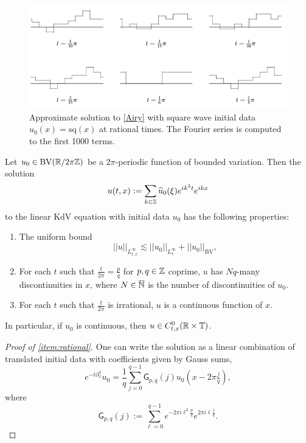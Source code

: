 \begin{figure}[h]
	\begin{center}
		\includegraphics{graphics/olver2}
	\end{center}
	\caption{Approximate solution to \eqref{Airy} with square wave initial data $u_0 (x) = \mathrm{sq}(x)$ at rational times. The Fourier series is computed to the first 1000 terms.}\label{fig:olver2}
\end{figure}

\begin{theorem}\label{thm:talbot}
	Let $u_0 \in \mathrm{BV} (\mathbb R/2\pi \mathbb Z)$ be a $2\pi$-periodic function of bounded variation. Then the solution 
		\[
			u(t, x) 
				:= \sum_{k \in \mathbb Z} \widehat u_0 (\xi) e^{i k^3 t} e^{i k x}
		\]
	to the linear KdV equation with initial data $u_0$ has the following properties: 
	\begin{enumerate}
		\item The uniform bound
			\[
				||u||_{L^{\infty}_{t, x}} 
					\lesssim ||u_0||_{L^\infty_x} + ||u_0||_{\mathrm{BV}}, 
			\]
		
			\item For each $t$ such that $\tfrac{t}{2\pi} = \tfrac{p}{q}$ for $p, q \in \mathbb Z$ coprime, $u$ has $Nq$-many discontinuities in $x$, where $N \in \overline {\mathbb N}$ is the number of discontinuities of $u_0$. \label{item:rational}
        
			\item For each $t$ such that $\tfrac{t}{2\pi}$ is irrational, $u$ is a continuous function of $x$.
	\end{enumerate}
	In particular, if $u_0$ is continuous, then $u \in C^0_{t, x} (\mathbb R \times \mathbb T)$. 
\end{theorem}

\begin{proof}[Proof of \ref{item:rational}]
	One can write the solution as a linear combination of translated initial data with coefficients given by Gauss sums, 
	\[
			e^{-t \partial_x^3} u_0 
				= \frac1q \sum_{j = 0}^{q - 1} \mathsf G_{p, q} (j) u_0 \left( x - 2\pi \tfrac{j}{q} \right),
		\]
	where 
		\[
			\mathsf G_{p, q} (j)
				:= \sum_{\ell = 0}^{q - 1} e^{-2\pi i \ell^3 \frac{p}{q}} e^{2\pi i \ell \frac{j}{q}}.
		\]
\end{proof}

